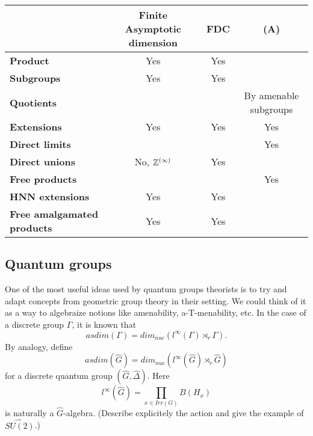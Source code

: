 \begin{table}[h]
\begin{tabular}{c|c|c|c|}
\cline{2-4}
                                                         & \textbf{Finite Asymptotic dimension} & \textbf{FDC} & \textbf{(A)}    \\ \hline
\multicolumn{1}{|l|}{\textbf{Product}}                   &              Yes     &            Yes    &                            \\ \hline
\multicolumn{1}{|l|}{\textbf{Subgroups}}                 &              Yes     &           Yes     &                             \\ \hline
\multicolumn{1}{|l|}{\textbf{Quotients}}                 &                      &                   &     By amenable subgroups   \\ \hline
\multicolumn{1}{|l|}{\textbf{Extensions}}                &            Yes       &            Yes    &     Yes                     \\ \hline
\multicolumn{1}{|l|}{\textbf{Direct limits}}             &                      &                   &     Yes                     \\ \hline
\multicolumn{1}{|l|}{\textbf{Direct unions}}             & No, $\mathbb Z ^{(\infty)}$ &            Yes    &                             \\ \hline
\multicolumn{1}{|l|}{\textbf{Free products}}             &                      &                   &     Yes                     \\ \hline
\multicolumn{1}{|l|}{\textbf{HNN extensions}}            &          Yes         &             Yes   &                             \\ \hline
\multicolumn{1}{|l|}{\textbf{Free amalgamated products}} &           Yes        &              Yes  &                             \\ \hline
\end{tabular}
\end{table}

\subsection{Quantum groups}

One of the most useful ideas used by quantum groups theorists is to try and adapt concepts from geometric group theory in their setting. We could think of it as a way to algebraize notions like amenability, a-T-menability, etc. In the case of a discrete group $\Gamma$, it is known \cite{GWY} that
\[asdim(\Gamma) = dim_{nuc} (l^\infty (\Gamma) \rtimes_r \Gamma).\] 
By analogy, define \[asdim(\hat G) = dim_{nuc} (l^\infty (\hat G) \rtimes_r \hat G)\]
for a discrete quantum group $(\hat G, \hat \Delta)$. Here
\[l^\infty(\hat G) = \prod_{x\in Irr(G)} B(H_x)\]
is naturally a $\hat G$-algebra. (Describe explicitely the action and give the example of $\hat{SU(2)}$.)\\

